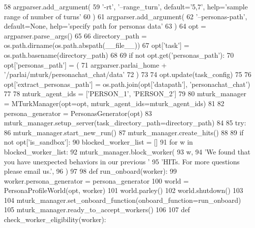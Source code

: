 \begin{DoxyCode}
58     argparser.add\_argument(
59         \textcolor{stringliteral}{'-rt'}, \textcolor{stringliteral}{'--range\_turn'}, default=\textcolor{stringliteral}{'5,7'}, help=\textcolor{stringliteral}{'sample range of number of turns'}
60     )
61     argparser.add\_argument(
62         \textcolor{stringliteral}{'--personas-path'}, default=\textcolor{keywordtype}{None}, help=\textcolor{stringliteral}{'specify path for personas data'}
63     )
64     opt = argparser.parse\_args()
65 
66     directory\_path = os.path.dirname(os.path.abspath(\_\_file\_\_))
67     opt[\textcolor{stringliteral}{'task'}] = os.path.basename(directory\_path)
68 
69     \textcolor{keywordflow}{if} \textcolor{keywordflow}{not} opt.get(\textcolor{stringliteral}{'personas\_path'}):
70         opt[\textcolor{stringliteral}{'personas\_path'}] = (
71             argparser.parlai\_home + \textcolor{stringliteral}{'/parlai/mturk/personachat\_chat/data'}
72         )
73 
74     opt.update(task\_config)
75 
76     opt[\textcolor{stringliteral}{'extract\_personas\_path'}] = os.path.join(opt[\textcolor{stringliteral}{'datapath'}], \textcolor{stringliteral}{'personachat\_chat'})
77 
78     mturk\_agent\_ids = [\textcolor{stringliteral}{'PERSON\_1'}, \textcolor{stringliteral}{'PERSON\_2'}]
79 
80     mturk\_manager = MTurkManager(opt=opt, mturk\_agent\_ids=mturk\_agent\_ids)
81 
82     persona\_generator = PersonasGenerator(opt)
83     mturk\_manager.setup\_server(task\_directory\_path=directory\_path)
84 
85     \textcolor{keywordflow}{try}:
86         mturk\_manager.start\_new\_run()
87         mturk\_manager.create\_hits()
88 
89         \textcolor{keywordflow}{if} \textcolor{keywordflow}{not} opt[\textcolor{stringliteral}{'is\_sandbox'}]:
90             blocked\_worker\_list = []
91             \textcolor{keywordflow}{for} w \textcolor{keywordflow}{in} blocked\_worker\_list:
92                 mturk\_manager.block\_worker(
93                     w,
94                     \textcolor{stringliteral}{'We found that you have unexpected behaviors in our previous '}
95                     \textcolor{stringliteral}{'HITs. For more questions please email us.'},
96                 )
97 
98         \textcolor{keyword}{def }run\_onboard(worker):
99             worker.persona\_generator = persona\_generator
100             world = PersonaProfileWorld(opt, worker)
101             world.parley()
102             world.shutdown()
103 
104         mturk\_manager.set\_onboard\_function(onboard\_function=run\_onboard)
105         mturk\_manager.ready\_to\_accept\_workers()
106 
107         \textcolor{keyword}{def }check\_worker\_eligibility(worker):

\end{DoxyCode}

